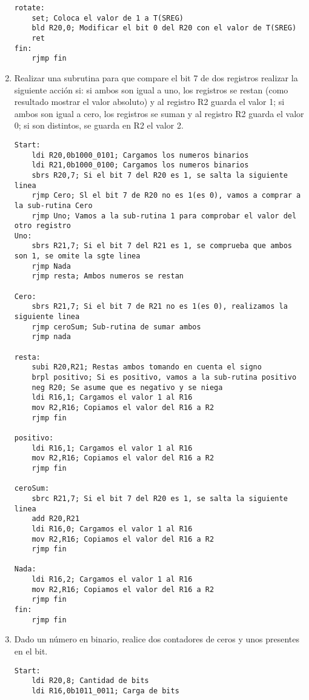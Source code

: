 \documentclass[
	12pt, %
	fleqn, %
	a4paper, %
	oneside, %
]{LegrandOrangeBook}
\begin{document}
\begin{enumerate}
\begin{lstlisting}[language={[RISC-V]Assembler},frame=single,caption={Uso del SET para modificar T(SREG)},captionpos=b,numbers=none]
rotate:
	set; Coloca el valor de 1 a T(SREG)
	bld R20,0; Modificar el bit 0 del R20 con el valor de T(SREG)
	ret
fin:
	rjmp fin
\end{lstlisting}
\item Realizar una subrutina para que compare el bit 7 de dos registros realizar la siguiente acción si: si ambos son igual a uno, los registros se restan (como resultado mostrar el valor absoluto) y al registro R2 guarda el valor 1; si ambos son igual a cero, los registros se suman y al registro R2 guarda el valor 0; si son distintos, se guarda en R2 el valor 2.
\begin{lstlisting}[language={[RISC-V]Assembler},frame=single,caption={Sub-rutinas con comparación de bits},captionpos=b,numbers=none]
Start:
	ldi R20,0b1000_0101; Cargamos los numeros binarios 
	ldi R21,0b1000_0100; Cargamos los numeros binarios
	sbrs R20,7; Si el bit 7 del R20 es 1, se salta la siguiente linea
	rjmp Cero; Sl el bit 7 de R20 no es 1(es 0), vamos a comprar a la sub-rutina Cero
	rjmp Uno; Vamos a la sub-rutina 1 para comprobar el valor del otro registro
Uno:
	sbrs R21,7; Si el bit 7 del R21 es 1, se comprueba que ambos son 1, se omite la sgte linea
	rjmp Nada
	rjmp resta; Ambos numeros se restan

Cero:
	sbrs R21,7; Si el bit 7 de R21 no es 1(es 0), realizamos la siguiente linea
	rjmp ceroSum; Sub-rutina de sumar ambos
	rjmp nada

resta:
	subi R20,R21; Restas ambos tomando en cuenta el signo
	brpl positivo; Si es positivo, vamos a la sub-rutina positivo
	neg R20; Se asume que es negativo y se niega
	ldi R16,1; Cargamos el valor 1 al R16
	mov R2,R16; Copiamos el valor del R16 a R2
	rjmp fin

positivo:
	ldi R16,1; Cargamos el valor 1 al R16
	mov R2,R16; Copiamos el valor del R16 a R2
	rjmp fin

ceroSum:
	sbrc R21,7; Si el bit 7 del R20 es 1, se salta la siguiente linea
	add R20,R21
	ldi R16,0; Cargamos el valor 1 al R16
	mov R2,R16; Copiamos el valor del R16 a R2
	rjmp fin

Nada: 
	ldi R16,2; Cargamos el valor 1 al R16
	mov R2,R16; Copiamos el valor del R16 a R2
	rjmp fin
fin:
	rjmp fin
\end{lstlisting}
\item Dado un número en binario, realice dos contadores de ceros y unos presentes en el bit.
\begin{lstlisting}[language={[RISC-V]Assembler},frame=single,caption={Contador de ceros},captionpos=b,numbers=none]
Start:
	ldi R20,8; Cantidad de bits
	ldi R16,0b1011_0011; Carga de bits


\end{lstlisting}
\end{enumerate}
\end{document}
